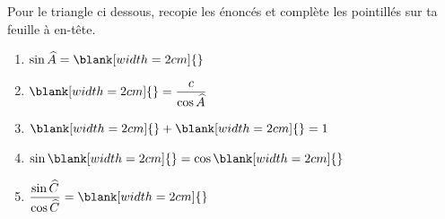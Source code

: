 %
%
    Pour le triangle ci dessous, recopie les énoncés et complète les pointillés sur ta feuille à en-tête.
    \begin{center}
        
    \end{center}
    \bigbreak
    \begin{enumerate}[cols=2]
        \item $\sin \widehat{A} = \blank[width=2cm]{}$
        \item $ \blank[width=2cm]{} = \dfrac{c}{\cos \widehat{A}}$
        \item $ \blank[width=2cm]{} + \blank[width=2cm]{} = 1$
        \item $ \sin \blank[width=2cm]{} = \cos \blank[width=2cm]{}$
        \item $ \dfrac{\sin\widehat{C}}{\cos\widehat{C}} = \blank[width=2cm]{}$
    \end{enumerate}
